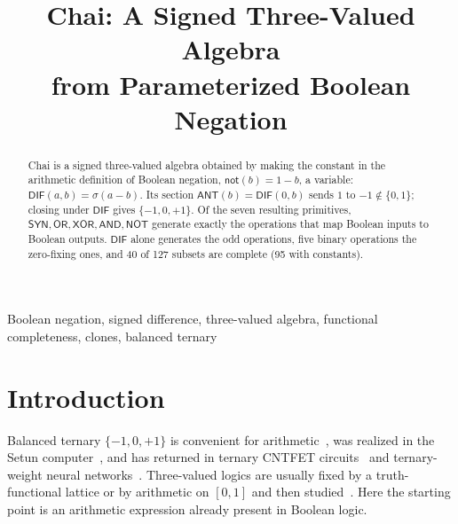 \documentclass[conference]{IEEEtran}
\newif\ifanon
\newcommand{\sgn}{\sigma}
\newcommand{\SYN}{\mathsf{SYN}}
\newcommand{\DIF}{\mathsf{DIF}}
\newcommand{\OR}{\mathsf{OR}}
\newcommand{\XOR}{\mathsf{XOR}}
\newcommand{\AND}{\mathsf{AND}}
\newcommand{\NOT}{\mathsf{NOT}}
\newcommand{\ANT}{\mathsf{ANT}}
\theoremstyle{remark}
\begin{document}
	
	\title{Chai: A Signed Three-Valued Algebra\\ from Parameterized Boolean Negation}
	
	\ifanon
	\author{\IEEEauthorblockN{Anonymous Author(s)}}
	\else
	\author{
		}
	\fi
	
	\maketitle
	
	\begin{abstract}
		Chai is a signed three-valued algebra obtained by making the constant in the arithmetic definition of Boolean negation, $\mathsf{not}(b)=1-b$, a variable: $\DIF(a,b)=\sgn(a-b)$. Its section $\ANT(b)=\DIF(0,b)$ sends $1$ to $-1\notin\{0,1\}$; closing under $\DIF$ gives $\{-1,0,+1\}$. Of the seven resulting primitives, $\SYN,\OR,\XOR,\AND,\NOT$ generate exactly the operations that map Boolean inputs to Boolean outputs. $\DIF$ alone generates the odd operations, five binary operations the zero-fixing ones, and 40 of 127 subsets are complete (95 with constants).
	\end{abstract}
	
	\begin{IEEEkeywords}
		Boolean negation, signed difference, three-valued algebra, functional completeness, clones, balanced ternary
	\end{IEEEkeywords}
	
	\section{Introduction}
	Balanced ternary $\{-1,0,+1\}$ is convenient for arithmetic~\cite{knuth1997}, was realized in the Setun computer~\cite{brusentsov2011}, and has returned in ternary CNTFET circuits~\cite{lin2011,bos2022} and ternary-weight neural networks~\cite{ma2024}. Three-valued logics are usually fixed by a truth-functional lattice or by arithmetic on $[0,1]$ and then studied~\cite{kleene1952,cignoli2000}. Here the starting point is an arithmetic expression already present in Boolean logic.
	
\end{document}
